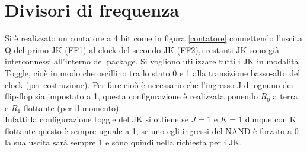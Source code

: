 \documentclass[10pt,a4paper]{article}
\begin{document}

\section{Divisori di frequenza}
Si è realizzato un contatore a 4 bit come in figura \ref{contatore} connettendo l'uscita Q del primo JK (FF1) al clock del secondo JK (FF2),i restanti JK sono già interconnessi all'interno del package. Si vogliono utilizzare tutti i JK in modalità Toggle, cioè in modo che oscillino tra lo stato 0 e 1 alla transizione basso-alto del clock (per costruzione). Per fare cioò è necessario che l'ingresso J di ognuno dei flip-flop sia impostato a 1, questa configurazione è realizzata ponendo $R_0$ a terra e $R_1$ flottante (per il momento).\\
Infatti la configurazione toggle del JK si ottiene se $J = 1$ e $K = 1$ dunque con K flottante questo è sempre uguale a 1, se uno egli ingressi del NAND è forzato a 0 la sua uscita sarà sempre 1 e sono quindi nella richiesta per i JK.\\  
\end{document}
